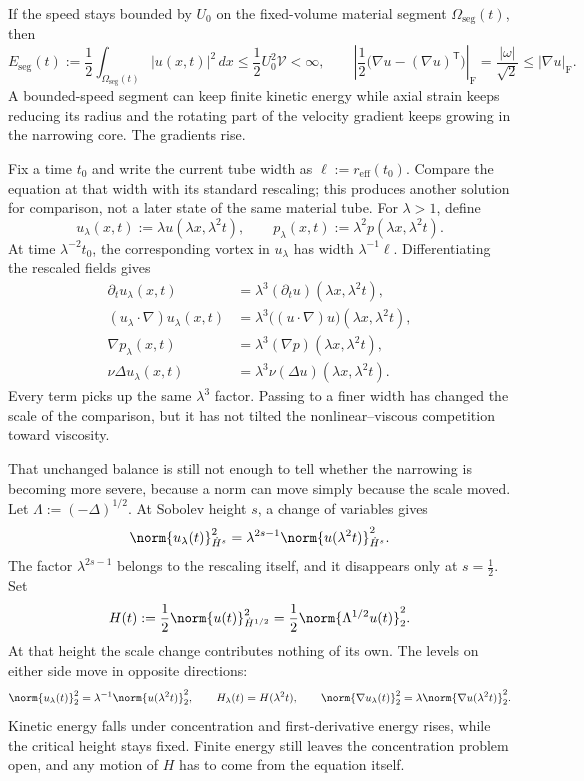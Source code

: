 If the speed stays bounded by \(U_0\) on the fixed-volume material segment \(\Omega_{\mathrm{seg}}(t)\), then
\[
  E_{\mathrm{seg}}(t)
  :=
  \frac12\int_{\Omega_{\mathrm{seg}}(t)}|u(x,t)|^2\,dx
  \leq
  \frac12U_0^2\mathcal V
  <
  \infty,
  \qquad
  \left|\frac12\bigl(\nabla u-(\nabla u)^{\mathsf T}\bigr)\right|_{\mathrm F}
  =
  \frac{|\omega|}{\sqrt2}
  \leq
  |\nabla u|_{\mathrm F}.
\]
A bounded-speed segment can keep finite kinetic energy while axial strain keeps reducing its radius and the rotating part of the velocity gradient keeps growing in the narrowing core. The gradients rise.


Fix a time \(t_0\) and write the current tube width as \(\ell:=r_{\mathrm{eff}}(t_0)\). Compare the equation at that width with its standard rescaling; this produces another solution for comparison, not a later state of the same material tube. For \(\lambda>1\), define
\[
  u_\lambda(x,t)
  :=
  \lambda u(\lambda x,\lambda^2t),
  \qquad
  p_\lambda(x,t)
  :=
  \lambda^2p(\lambda x,\lambda^2t).
\]
At time \(\lambda^{-2}t_0\), the corresponding vortex in \(u_\lambda\) has width \(\lambda^{-1}\ell\). Differentiating the rescaled fields gives
\[
\begin{aligned}
  \partial_tu_\lambda(x,t)
  &=
  \lambda^3(\partial_tu)(\lambda x,\lambda^2t),
  \\
  (u_\lambda\cdot\nabla)u_\lambda(x,t)
  &=
  \lambda^3\bigl((u\cdot\nabla)u\bigr)(\lambda x,\lambda^2t),
  \\
  \nabla p_\lambda(x,t)
  &=
  \lambda^3(\nabla p)(\lambda x,\lambda^2t),
  \\
  \nu\Delta u_\lambda(x,t)
  &=
  \lambda^3\nu(\Delta u)(\lambda x,\lambda^2t).
\end{aligned}
\]
Every term picks up the same \(\lambda^3\) factor. Passing to a finer width has changed the scale of the comparison, but it has not tilted the nonlinear--viscous competition toward viscosity.


That unchanged balance is still not enough to tell whether the narrowing is becoming more severe, because a norm can move simply because the scale moved. Let \(\Lambda:=(-\Delta)^{1/2}\). At Sobolev height \(s\), a change of variables gives
\[
  \norm{u_\lambda(t)}_{\dot H^s}^2
  =
  \lambda^{2s-1}
  \norm{u(\lambda^2t)}_{\dot H^s}^2.
\]
The factor \(\lambda^{2s-1}\) belongs to the rescaling itself, and it disappears only at \(s=\tfrac12\). Set
\[
  H(t)
  :=
  \frac12\norm{u(t)}_{\dot H^{1/2}}^2
  =
  \frac12\norm{\Lambda^{1/2}u(t)}_2^2.
\]
At that height the scale change contributes nothing of its own. The levels on either side move in opposite directions:
\[
  \norm{u_\lambda(t)}_2^2
  =
  \lambda^{-1}\norm{u(\lambda^2t)}_2^2,
  \qquad
  H_\lambda(t)=H(\lambda^2t),
  \qquad
  \norm{\nabla u_\lambda(t)}_2^2
  =
  \lambda\norm{\nabla u(\lambda^2t)}_2^2.
\]
Kinetic energy falls under concentration and first-derivative energy rises, while the critical height stays fixed. Finite energy still leaves the concentration problem open, and any motion of \(H\) has to come from the equation itself.

